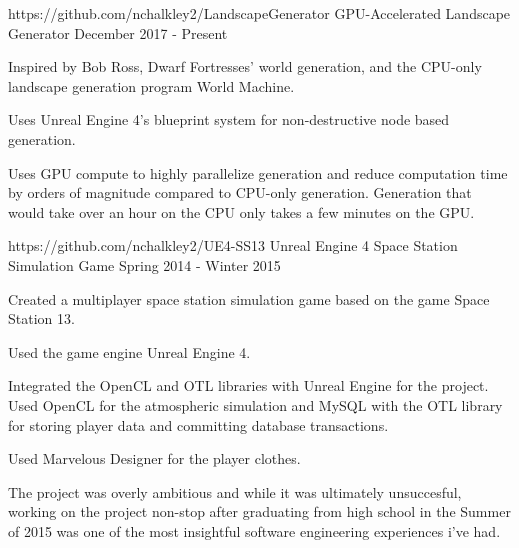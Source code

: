

\begin{cventries}

  \cventry
    {https://github.com/nchalkley2/LandscapeGenerator} %
	{GPU-Accelerated Landscape Generator} %
    {} %
    {December 2017 - Present} %
    {
      \begin{cvitems} %
        \item {Inspired by Bob Ross, Dwarf Fortresses' world generation, and the CPU-only landscape generation program World Machine.}
		\item {Uses Unreal Engine 4's blueprint system for non-destructive node based generation.}
		\item {Uses GPU compute to highly parallelize generation and reduce computation time by orders of magnitude compared to CPU-only generation. Generation that would take over an hour on the CPU only takes a few minutes on the GPU.}
      \end{cvitems}
    }

  \cventry
    {https://github.com/nchalkley2/UE4-SS13} %
	{Unreal Engine 4 Space Station Simulation Game} %
    {} %
    {Spring 2014 - Winter 2015} %
    {
      \begin{cvitems} %
	  	\item {Created a multiplayer space station simulation game based on the game Space Station 13.}
		\item {Used the game engine Unreal Engine 4.}
		\item {Integrated the OpenCL and OTL libraries with Unreal Engine for the project. Used OpenCL for the atmospheric simulation and MySQL with the OTL library for storing player data and committing database transactions.}
		\item {Used Marvelous Designer for the player clothes.}
		\item {The project was overly ambitious and while it was ultimately unsuccesful, working on the project non-stop after graduating from high school in the Summer of 2015 was one of the most insightful software engineering experiences i've had.}
      \end{cvitems}
    }
\end{cventries}
